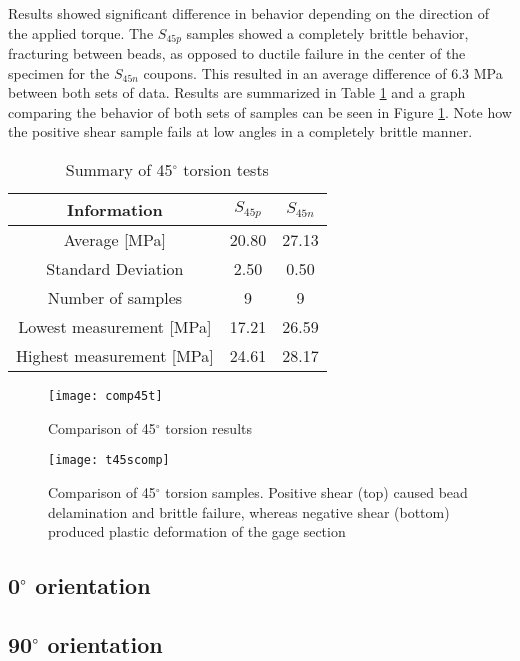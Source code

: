 \documentclass[main.tex]{subfiles}
\begin{document}
Results showed significant difference in behavior depending on the direction of the applied torque. The $S_{45p}$ samples showed a completely brittle behavior, fracturing between beads, as opposed to ductile failure in the center of the specimen for the $S_{45n}$ coupons. This resulted in an average difference of 6.3 MPa between both sets of data. Results are summarized in Table \ref{tab:tors45r} and a graph comparing the behavior of both sets of samples can be seen in Figure \ref{fig:45comp}. Note how the positive shear sample fails at low angles in a completely brittle manner.

\begin{table} [h]
	\centering
	\caption{Summary of 45$^\circ$ torsion tests}
\begin{tabular}{ c| c c } 
	\toprule
	\textbf{Information} & $S_{45p}$ & $S_{45n}$\\
	\midrule
	Average [MPa] & 20.80 & 27.13\\
	Standard Deviation & 2.50 & 0.50\\
	Number of samples & 9 & 9\\
	Lowest measurement [MPa] &17.21  & 26.59\\
	Highest measurement [MPa] &24.61 & 28.17\\
	\bottomrule
\end{tabular}
\label{tab:tors45r}
\end{table}

\begin{figure}[!htbp]
	\center
	\texttt{[image: comp45t]}
	\caption{Comparison of 45$^\circ$ torsion results} \label{fig:45comp}
\end{figure}

\begin{figure}[!htbp]
	\center
	\texttt{[image: t45scomp]}
	\captionsetup{justification=centering} %
	\caption[Comparison of 45$^\circ$ torsion results]{Comparison of 45$^\circ$ torsion samples. Positive shear (top) caused bead delamination and brittle failure, whereas negative shear (bottom) produced plastic deformation of the gage section} \label{fig:45scomp}
\end{figure}
  
\subsection{0$^\circ$ orientation} \label{ssec:0r}
\subsection{90$^\circ$ orientation} \label{ssec:90r}
\end{document}
